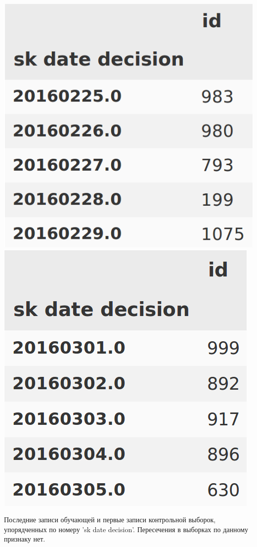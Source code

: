 \documentclass[russian, 10pt]{beamer}
\begin{document}
\begin{frame}


\includegraphics[scale=0.3]{images/sk_train.png}
\includegraphics[scale=0.31]{images/sk_test.png}

Последние записи обучающей и первые записи контрольной выборок, упорядченных по номеру 'sk date decision'. Пересечения в выборках по данному признаку нет.
\end{frame}
\end{document}

